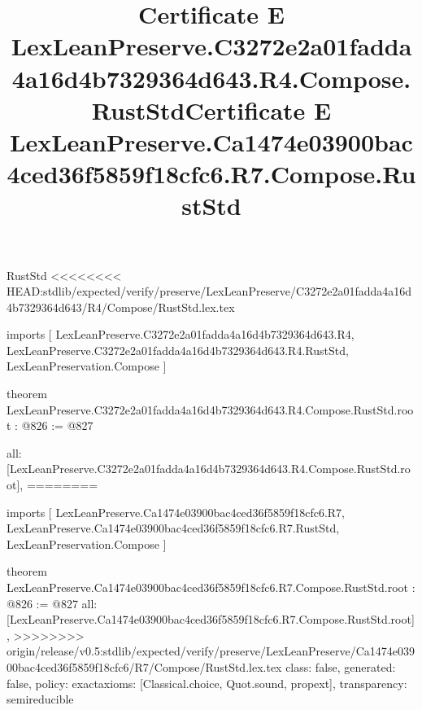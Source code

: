 \begin{lexlean}{RustStd}
<<<<<<<< HEAD:stdlib/expected/verify/preserve/LexLeanPreserve/C3272e2a01fadda4a16d4b7329364d643/R4/Compose/RustStd.lex.tex
\title{Certificate E LexLeanPreserve.C3272e2a01fadda4a16d4b7329364d643.R4.Compose.RustStd}
\begin{coremodule}
imports [
  LexLeanPreserve.C3272e2a01fadda4a16d4b7329364d643.R4,
  LexLeanPreserve.C3272e2a01fadda4a16d4b7329364d643.R4.RustStd,
  LexLeanPreservation.Compose
]

theorem LexLeanPreserve.C3272e2a01fadda4a16d4b7329364d643.R4.Compose.RustStd.root : @826 := @827 {
  all: [LexLeanPreserve.C3272e2a01fadda4a16d4b7329364d643.R4.Compose.RustStd.root],
========
\title{Certificate E LexLeanPreserve.Ca1474e03900bac4ced36f5859f18cfc6.R7.Compose.RustStd}
\begin{coremodule}
imports [
  LexLeanPreserve.Ca1474e03900bac4ced36f5859f18cfc6.R7,
  LexLeanPreserve.Ca1474e03900bac4ced36f5859f18cfc6.R7.RustStd,
  LexLeanPreservation.Compose
]

theorem LexLeanPreserve.Ca1474e03900bac4ced36f5859f18cfc6.R7.Compose.RustStd.root : @826 := @827 {
  all: [LexLeanPreserve.Ca1474e03900bac4ced36f5859f18cfc6.R7.Compose.RustStd.root],
>>>>>>>> origin/release/v0.5:stdlib/expected/verify/preserve/LexLeanPreserve/Ca1474e03900bac4ced36f5859f18cfc6/R7/Compose/RustStd.lex.tex
  class: false,
  generated: false,
  policy: exact{axioms: [Classical.choice, Quot.sound, propext]},
  transparency: semireducible
}


\end{coremodule}}
\end{coremodule}
\end{lexlean}
